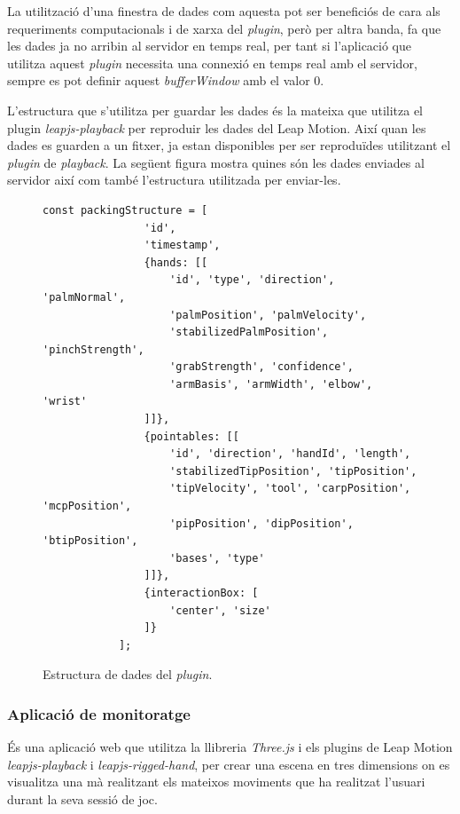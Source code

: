 \documentclass[12pt,a4paper,catalan]{article}
\begin{document}
	La utilització d'una finestra de dades com aquesta pot ser beneficiós de cara als requeriments computacionals i de xarxa del \textit{plugin}, però per altra banda, fa que les dades ja no arribin al servidor en temps real, per tant si l'aplicació que utilitza aquest \textit{plugin} necessita una connexió en temps real amb el servidor, sempre es pot definir aquest \textit{bufferWindow} amb el valor 0.
	
	L'estructura que s'utilitza per guardar les dades és la mateixa que utilitza el plugin \textit{leapjs-playback} \cite{leapjs-playback} per reproduir les dades del Leap Motion. Així quan les dades es guarden a un fitxer, ja estan disponibles per ser reproduïdes utilitzant el \textit{plugin} de \textit{playback}.
	La següent figura mostra quines són les dades enviades al servidor així com també l'estructura utilitzada per enviar-les.
	\begin{figure}[H]
		\begin{lstlisting}[gobble=12, tabsize=4]
			const packingStructure = [
				'id',
				'timestamp',
				{hands: [[
					'id', 'type', 'direction', 'palmNormal',
					'palmPosition', 'palmVelocity',
					'stabilizedPalmPosition', 'pinchStrength',
					'grabStrength', 'confidence',
					'armBasis', 'armWidth', 'elbow', 'wrist'
				]]},
				{pointables: [[
					'id', 'direction', 'handId', 'length',
					'stabilizedTipPosition', 'tipPosition',
					'tipVelocity', 'tool', 'carpPosition', 'mcpPosition',
					'pipPosition', 'dipPosition', 'btipPosition',
					'bases', 'type'
				]]},
				{interactionBox: [
					'center', 'size'
				]}
			];
		\end{lstlisting}
		\caption{Estructura de dades del \textit{plugin}.}
		\label{fig:packaging-structure}
	\end{figure}
	\subsubsection{Aplicació de monitoratge}
	És una aplicació web que utilitza la llibreria \textit{Three.js} i els plugins de Leap Motion \textit{leapjs-playback} i \textit{leapjs-rigged-hand}, per crear una escena en tres dimensions on es visualitza una mà realitzant els mateixos moviments que ha realitzat l'usuari durant la seva sessió de joc.
	
\end{document}
